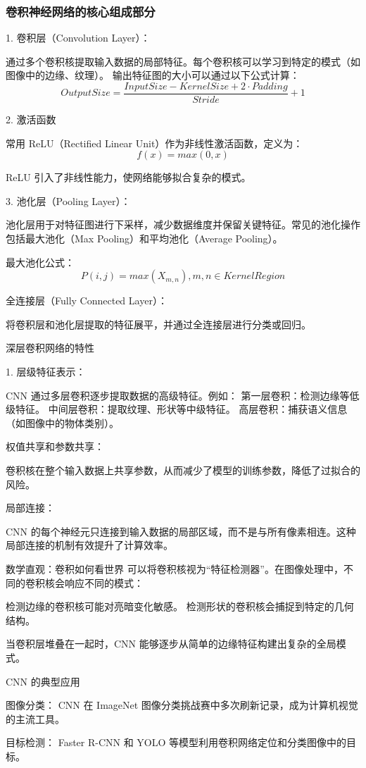 \subsubsection*{卷积神经网络的核心组成部分}
1. 卷积层（Convolution Layer）：

通过多个卷积核提取输入数据的局部特征。每个卷积核可以学习到特定的模式（如图像中的边缘、纹理）。
输出特征图的大小可以通过以下公式计算：
$$
Output Size=
\frac{Input Size -Kernel Size+2\cdot Padding}{Stride}+1$$

2. 激活函数

常用 ReLU（Rectified Linear Unit）作为非线性激活函数，定义为：
$$
f(x)=max(0,x)$$

ReLU 引入了非线性能力，使网络能够拟合复杂的模式。

3. 池化层（Pooling Layer）：

池化层用于对特征图进行下采样，减少数据维度并保留关键特征。常见的池化操作包括最大池化（Max Pooling）和平均池化（Average Pooling）。

最大池化公式：
$$P(i,j)=max(X_{m,n}) ,m,n\in Kernel Region$$

全连接层（Fully Connected Layer）：

将卷积层和池化层提取的特征展平，并通过全连接层进行分类或回归。

深层卷积网络的特性

1. 层级特征表示：

CNN 通过多层卷积逐步提取数据的高级特征。例如：
第一层卷积：检测边缘等低级特征。
中间层卷积：提取纹理、形状等中级特征。
高层卷积：捕获语义信息（如图像中的物体类别）。

权值共享和参数共享：

卷积核在整个输入数据上共享参数，从而减少了模型的训练参数，降低了过拟合的风险。

局部连接：

CNN 的每个神经元只连接到输入数据的局部区域，而不是与所有像素相连。这种局部连接的机制有效提升了计算效率。


数学直观：卷积如何看世界
可以将卷积核视为“特征检测器”。在图像处理中，不同的卷积核会响应不同的模式：

检测边缘的卷积核可能对亮暗变化敏感。
检测形状的卷积核会捕捉到特定的几何结构。

当卷积层堆叠在一起时，CNN 能够逐步从简单的边缘特征构建出复杂的全局模式。

CNN 的典型应用

图像分类：
CNN 在 ImageNet 图像分类挑战赛中多次刷新记录，成为计算机视觉的主流工具。

目标检测：
Faster R-CNN 和 YOLO 等模型利用卷积网络定位和分类图像中的目标。

